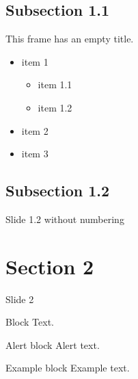 \documentclass{beamer}
\begin{document}
    \subsection{Subsection 1.1}
    \begin{frame}[plain]{}
        \subsectionpage
    \end{frame}
    \begin{frame}
        This frame has an empty title.
        \vfill
        \begin{itemize}
            \item item 1
            \begin{itemize}
                \item item 1.1
                \item item 1.2
            \end{itemize}
            \item item 2
            \item item 3
        \end{itemize}
    \end{frame}
    
    \subsection{Subsection 1.2}
    \begin{frame}[nonumber]{Slide 1.2 without numbering}
        \lipsum[2]
    \end{frame}
    
    \section[Short]{Section 2}
    \begin{frame}{Slide 2}
        \begin{block}{Block}
            Text.
        \end{block}
        \pause
        \begin{alertblock}{Alert block}
            Alert \alert{text}.
        \end{alertblock}
        \pause
        \begin{exampleblock}{Example block}
            Example {text}.
        \end{exampleblock}
    \end{frame}
\end{document}
